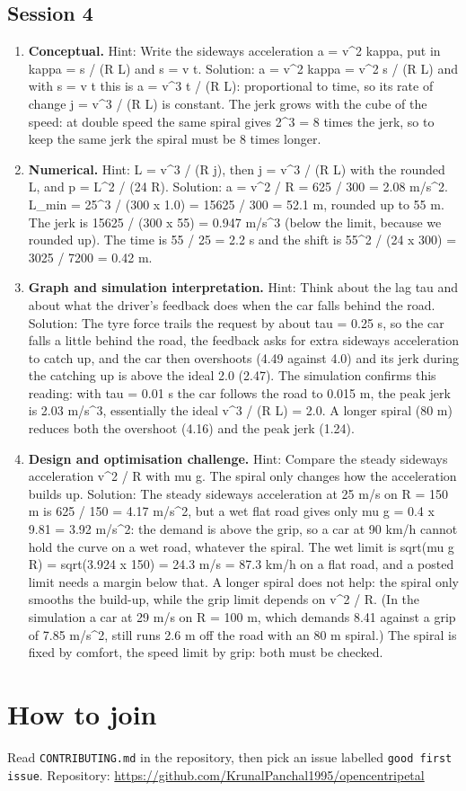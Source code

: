 \documentclass[11pt,a4paper]{article}
\begin{document}
\subsection*{Session 4}
\begin{enumerate}[nosep]
\item \textbf{Conceptual.} Hint: Write the sideways acceleration a = v\textasciicircum{}2 kappa, put in kappa = s / (R L) and s = v t. Solution: a = v\textasciicircum{}2 kappa = v\textasciicircum{}2 s / (R L) and with s = v t this is a = v\textasciicircum{}3 t / (R L): proportional to time, so its rate of change j = v\textasciicircum{}3 / (R L) is constant. The jerk grows with the cube of the speed: at double speed the same spiral gives 2\textasciicircum{}3 = 8 times the jerk, so to keep the same jerk the spiral must be 8 times longer.
\item \textbf{Numerical.} Hint: L = v\textasciicircum{}3 / (R j), then j = v\textasciicircum{}3 / (R L) with the rounded L, and p = L\textasciicircum{}2 / (24 R). Solution: a = v\textasciicircum{}2 / R = 625 / 300 = 2.08 m/s\textasciicircum{}2. L\_min = 25\textasciicircum{}3 / (300 x 1.0) = 15625 / 300 = 52.1 m, rounded up to 55 m. The jerk is 15625 / (300 x 55) = 0.947 m/s\textasciicircum{}3 (below the limit, because we rounded up). The time is 55 / 25 = 2.2 s and the shift is 55\textasciicircum{}2 / (24 x 300) = 3025 / 7200 = 0.42 m.
\item \textbf{Graph and simulation interpretation.} Hint: Think about the lag tau and about what the driver's feedback does when the car falls behind the road. Solution: The tyre force trails the request by about tau = 0.25 s, so the car falls a little behind the road, the feedback asks for extra sideways acceleration to catch up, and the car then overshoots (4.49 against 4.0) and its jerk during the catching up is above the ideal 2.0 (2.47). The simulation confirms this reading: with tau = 0.01 s the car follows the road to 0.015 m, the peak jerk is 2.03 m/s\textasciicircum{}3, essentially the ideal v\textasciicircum{}3 / (R L) = 2.0. A longer spiral (80 m) reduces both the overshoot (4.16) and the peak jerk (1.24).
\item \textbf{Design and optimisation challenge.} Hint: Compare the steady sideways acceleration v\textasciicircum{}2 / R with mu g. The spiral only changes how the acceleration builds up. Solution: The steady sideways acceleration at 25 m/s on R = 150 m is 625 / 150 = 4.17 m/s\textasciicircum{}2, but a wet flat road gives only mu g = 0.4 x 9.81 = 3.92 m/s\textasciicircum{}2: the demand is above the grip, so a car at 90 km/h cannot hold the curve on a wet road, whatever the spiral. The wet limit is sqrt(mu g R) = sqrt(3.924 x 150) = 24.3 m/s = 87.3 km/h on a flat road, and a posted limit needs a margin below that. A longer spiral does not help: the spiral only smooths the build-up, while the grip limit depends on v\textasciicircum{}2 / R. (In the simulation a car at 29 m/s on R = 100 m, which demands 8.41 against a grip of 7.85 m/s\textasciicircum{}2, still runs 2.6 m off the road with an 80 m spiral.) The spiral is fixed by comfort, the speed limit by grip: both must be checked.
\end{enumerate}

\section{How to join}
Read \texttt{CONTRIBUTING.md} in the repository, then pick an issue labelled \texttt{good first issue}. Repository: \url{https://github.com/KrunalPanchal1995/opencentripetal}
\end{document}

